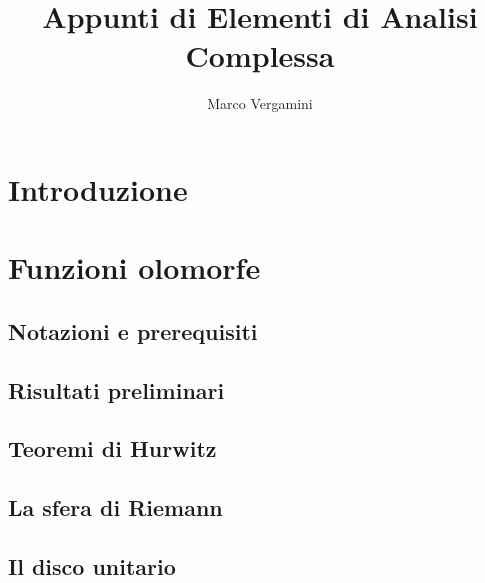 \documentclass{article}
\title{Appunti di Elementi di Analisi Complessa}
\date{}
\author{Marco Vergamini}
\begin{document}
\maketitle
\newpage
\tableofcontents
\newpage


\section{Introduzione}


\newpage

\section{Funzioni olomorfe}

\subsection{Notazioni e prerequisiti}


\subsection{Risultati preliminari}


\subsection{Teoremi di Hurwitz}


\subsection{La sfera di Riemann}


\subsection{Il disco unitario}

\end{document}
